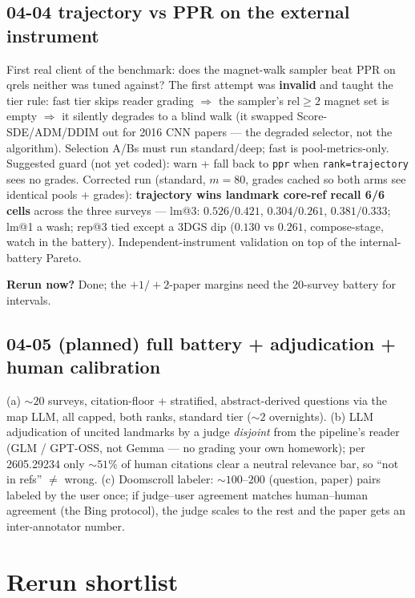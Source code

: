 \documentclass[10pt]{article}
\newcommand{\rerun}[1]{\par\smallskip\noindent\textbf{Rerun now?} #1}
\begin{document}
\subsection*{04-04 trajectory vs PPR on the external instrument}
First real client of the benchmark: does the magnet-walk sampler beat PPR on qrels neither was
tuned against? The first attempt was \textbf{invalid} and taught the tier rule: fast tier skips
reader grading $\Rightarrow$ the sampler's rel$\geq 2$ magnet set is empty $\Rightarrow$ it
silently degrades to a blind walk (it swapped Score-SDE/ADM/DDIM out for 2016 CNN papers ---
the degraded selector, not the algorithm). Selection A/Bs must run standard/deep; fast is
pool-metrics-only. Suggested guard (not yet coded): warn + fall back to \texttt{ppr} when
\texttt{rank=trajectory} sees no grades. Corrected run (standard, $m{=}80$, grades cached so
both arms see identical pools + grades): \textbf{trajectory wins landmark core-ref recall 6/6
cells} across the three surveys --- lm@3: $0.526/0.421$, $0.304/0.261$, $0.381/0.333$; lm@1 a
wash; rep@3 tied except a 3DGS dip ($0.130$ vs $0.261$, compose-stage, watch in the battery).
Independent-instrument validation on top of the internal-battery Pareto.
\rerun{Done; the $+1/+2$-paper margins need the 20-survey battery for intervals.}

\subsection*{04-05 (planned) full battery + adjudication + human calibration}
(a) ${\sim}20$ surveys, citation-floor + stratified, abstract-derived questions via the map
LLM, all capped, both ranks, standard tier (${\sim}2$ overnights). (b) LLM adjudication of
uncited landmarks by a judge \emph{disjoint} from the pipeline's reader (GLM / GPT-OSS, not
Gemma --- no grading your own homework); per 2605.29234 only ${\sim}51\%$ of human citations
clear a neutral relevance bar, so ``not in refs'' $\neq$ wrong. (c) Doomscroll labeler:
${\sim}100$--$200$ (question, paper) pairs labeled by the user once; if judge--user agreement
matches human--human agreement (the Bing protocol), the judge scales to the rest and the paper
gets an inter-annotator number.

\section{Rerun shortlist}
\end{document}
